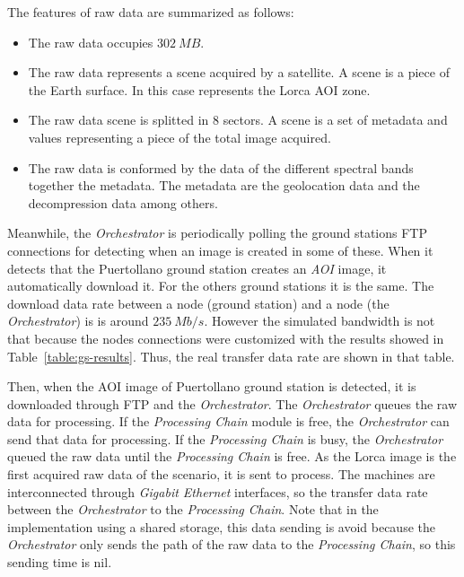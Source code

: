 The features of raw data are summarized as follows:
\begin{itemize}
\item The raw data occupies $302~MB$. 
\item The raw data represents a scene acquired by a satellite. A scene is a
  piece of the Earth surface. In this case represents the Lorca \ac{AOI} zone.
\item The raw data scene is splitted in 8 sectors. A scene is a set of metadata and
  values representing a piece of the total image acquired.
\item The raw data is conformed by the data of the different spectral bands
  together the metadata. The metadata are the geolocation data and the
  decompression data among others.
\end{itemize}


Meanwhile, the \emph{Orchestrator} is periodically polling the ground stations
\ac{FTP} connections for detecting when an image is created in some of
these. When it detects that the Puertollano ground station creates an \emph{AOI}
image, it automatically download it. For the others ground stations it is the
same. The download data rate between a \vw node (ground station) and a \bonfire
node (the \emph{Orchestrator}) is is around $235~Mb/s$. However the simulated
bandwidth is not that because the \vw nodes connections were customized with the results
showed in Table~\ref{table:gs-results}. Thus, the real transfer data rate are
shown in that table.

Then, when the \ac{AOI} image of Puertollano ground station is detected, it is
downloaded through \ac{FTP} and the \emph{Orchestrator}. The \emph{Orchestrator}
queues the raw data for processing. If the \emph{Processing Chain} module is free,
the \emph{Orchestrator} can send that data for processing. If the
\emph{Processing Chain} is busy, the \emph{Orchestrator} queued the raw data until
the \emph{Processing Chain} is free. 
As the Lorca image is the first acquired raw data of the scenario, it is sent to
process. The \bonfire machines are interconnected through  \emph{Gigabit Ethernet}
interfaces, so the transfer data rate between the  \emph{Orchestrator} to the
\emph{Processing Chain}. Note that in the implementation using a shared storage,
this data sending is avoid because the \emph{Orchestrator} only sends the path
of the raw data to the \emph{Processing Chain}, so this sending time is nil.

